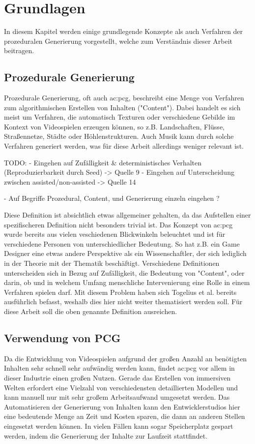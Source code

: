 %
\chapter{Grundlagen}
In diesem Kapitel werden einige grundlegende Konzepte als auch Verfahren der prozeduralen Generierung vorgestellt, welche zum
Verständnis dieser Arbeit beitragen.

\section{Prozedurale Generierung}
Prozedurale Generierung, oft auch \gls{ac:pcg}, beschreibt eine Menge von Verfahren zum
algorithmischen Erstellen von Inhalten ("Content"). Dabei handelt es sich meist um Verfahren, die automatisch Texturen
oder verschiedene Gebilde im Kontext von Videospielen erzeugen können, so z.B. Landschaften, Flüsse, Straßennetze,
Städte oder Höhlenstrukturen. Auch Musik kann durch solche Verfahren generiert werden, was für diese Arbeit allerdings
weniger relevant ist. \cite{9_togelius_et_al}

TODO:
- Eingehen auf Zufälligkeit \& deterministisches Verhalten (Reproduzierbarkeit durch Seed) -> Quelle 9
- Eingehen auf Unterscheidung zwischen assisted/non-assisted -> Quelle 14

- Auf Begriffe Prozedural, Content, und Generierung einzeln eingehen ?

Diese Definition ist absichtlich etwas allgemeiner gehalten, da das Aufstellen einer spezifischeren Definition nicht
besonders trivial ist. Das Konzept von \gls{ac:pcg} wurde bereits aus vielen veschiedenen Blickwinkeln beleuchtet und ist für verschiedene
Personen von unterschiedlicher Bedeutung. So hat z.B. ein Game Designer eine etwas andere Perspektive als ein Wissenschaftler, der
sich lediglich in der Theorie mit der Thematik beschäftigt. Verschiedene Definitionen unterscheiden sich in Bezug auf
Zufälligkeit, die Bedeutung von "Content", oder darin, ob und in welchem Umfang menschliche Intervenierung eine Rolle in einem
Verfahren spielen darf. Mit diesem Problem haben sich Togelius et al. \cite{9_togelius_et_al} bereits ausführlich befasst, weshalb dies hier
nicht weiter thematisiert werden soll. Für diese Arbeit soll die oben genannte Definition ausreichen.

\section{Verwendung von PCG}
Da die Entwicklung von Videospielen aufgrund der großen Anzahl an benötigten Inhalten sehr schnell sehr aufwändig werden
kann, findet \gls{ac:pcg} vor allem in dieser Industrie einen großen Nutzen. Gerade das Erstellen von immersiven Welten erfordert eine Vielzahl
von verschiedensten detaillierten Modellen und kann manuell nur mit sehr großem Arbeitsaufwand umgesetzt werden. Das Automatisieren der
Generierung von Inhalten kann den Entwicklerstudios hier eine bedeutende Menge an Zeit und Kosten sparen, die dann an anderen
Stellen eingesetzt werden können. In vielen Fällen kann sogar Speicherplatz gespart werden, indem die Generierung der Inhalte
zur Laufzeit stattfindet.

